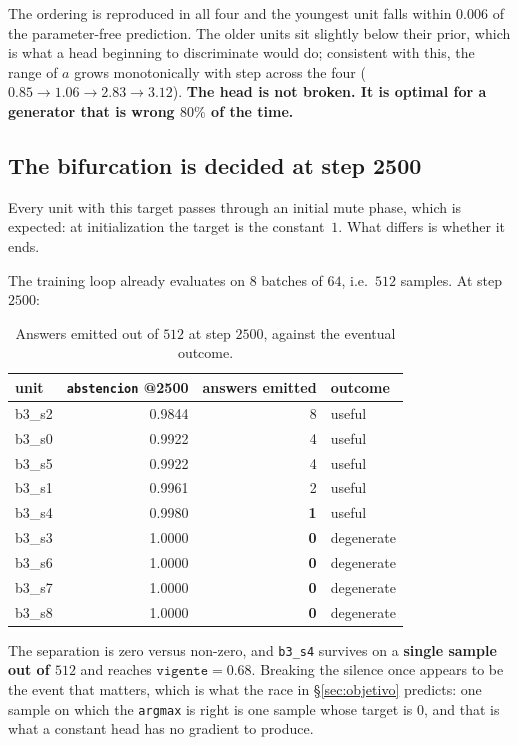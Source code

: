 \documentclass[11pt,a4paper]{article}
\begin{document}
The ordering is reproduced in all four and the youngest unit falls within $0.006$ of the
parameter-free prediction. The older units sit slightly below their prior, which is what a head
beginning to discriminate would do; consistent with this, the range of $a$ grows monotonically with
step across the four ($0.85 \to 1.06 \to 2.83 \to 3.12$). \textbf{The head is not broken. It is
optimal for a generator that is wrong $80\%$ of the time.}

\subsection{The bifurcation is decided at step 2500}
\label{sec:bifurcacion}

Every unit with this target passes through an initial mute phase, which is expected: at
initialization the target is the constant~$1$. What differs is whether it ends.

The training loop already evaluates on $8$ batches of $64$, i.e.\ $512$ samples. At step $2500$:

\begin{table}[h]
\centering
\caption{Answers emitted out of $512$ at step $2500$, against the eventual outcome.}
\begin{tabular}{lrrl}
\toprule
unit & \texttt{abstencion} @2500 & answers emitted & outcome \\
\midrule
b3\_s2 & 0.9844 & 8 & useful \\
b3\_s0 & 0.9922 & 4 & useful \\
b3\_s5 & 0.9922 & 4 & useful \\
b3\_s1 & 0.9961 & 2 & useful \\
b3\_s4 & 0.9980 & \textbf{1} & useful \\
\midrule
b3\_s3 & 1.0000 & \textbf{0} & degenerate \\
b3\_s6 & 1.0000 & \textbf{0} & degenerate \\
b3\_s7 & 1.0000 & \textbf{0} & degenerate \\
b3\_s8 & 1.0000 & \textbf{0} & degenerate \\
\bottomrule
\end{tabular}
\label{tab:bifurcacion}
\end{table}

The separation is zero versus non-zero, and \texttt{b3\_s4} survives on a \textbf{single sample out
of $512$} and reaches $\texttt{vigente} = 0.68$. Breaking the silence once appears to be the event
that matters, which is what the race in \S\ref{sec:objetivo} predicts: one sample on which the
\texttt{argmax} is right is one sample whose target is $0$, and that is what a constant head has no
gradient to produce.
\end{document}
